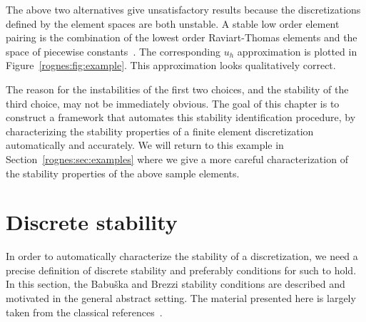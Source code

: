The above two alternatives give unsatisfactory results because
the discretizations defined by the element spaces are both
unstable. A stable low order element pairing is the combination of
the lowest order Raviart-Thomas elements and the space of piecewise
constants~\citep{RaviartThomas1977}. The corresponding $u_h$ approximation
is plotted in Figure~\ref{rognes:fig:example}. This
approximation looks qualitatively correct.

The reason for the instabilities of the first two choices, and the
stability of the third choice, may not be immediately obvious. The
goal of this chapter is to construct a framework that automates this
stability identification procedure, by characterizing the stability
properties of a finite element discretization automatically and
accurately.  We will return to this example in
Section~\ref{rognes:sec:examples} where we give a more careful
characterization of the stability properties of the above sample
elements.



\section{Discrete stability}

In order to automatically characterize the stability of a
discretization, we need a precise definition of discrete stability and
preferably conditions for such to hold. In this section, the Babu\v
ska and Brezzi stability conditions are described and motivated in the
general abstract setting. The material presented here is largely taken
from the classical references~\citep{Babuvska1972/73, Brezzi1974,
  BrezziFortin1991}.


